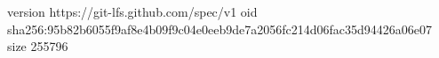 version https://git-lfs.github.com/spec/v1
oid sha256:95b82b6055f9af8e4b09f9c04e0eeb9de7a2056fc214d06fac35d94426a06e07
size 255796
